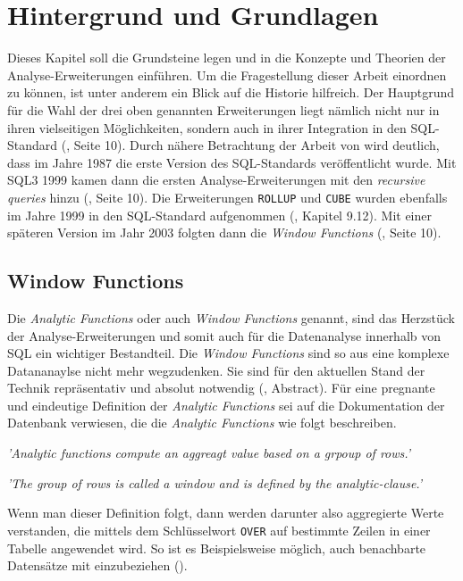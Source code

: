 \chapter{Hintergrund und Grundlagen}
Dieses Kapitel soll die Grundsteine legen und in die Konzepte und Theorien der Analyse-Erweiterungen
einführen. Um die Fragestellung dieser Arbeit einordnen zu können, ist unter anderem
ein Blick auf die Historie hilfreich. Der Hauptgrund für die Wahl der drei oben
genannten Erweiterungen liegt nämlich nicht nur in ihren vielseitigen
Möglichkeiten, sondern auch in ihrer Integration in den SQL-Standard (\cite{grust2017advanced},
Seite 10). Durch nähere Betrachtung der Arbeit von \cite{grust2017advanced} wird
deutlich, dass im Jahre 1987 die erste Version des SQL-Standards veröffentlicht
wurde. Mit SQL3 1999 kamen dann die ersten Analyse-Erweiterungen mit den \textit{recursive
queries} hinzu (\cite{grust2017advanced}, Seite 10). Die Erweiterungen \texttt{ROLLUP}
und \texttt{CUBE} wurden ebenfalls im Jahre 1999 in den SQL-Standard aufgenommen
(\cite{melton2001sql}, Kapitel 9.12). Mit einer späteren Version im Jahr 2003
folgten dann die \textit{Window Functions} (\cite{grust2017advanced}, Seite 10).

\section{Window Functions}
Die \textit{Analytic Functions} oder auch \textit{Window Functions} genannt, sind
das Herzstück der Analyse-Erweiterungen und somit auch für die Datenanalyse innerhalb
von SQL ein wichtiger Bestandteil. Die \textit{Window Functions} sind so aus eine
komplexe Datananaylse nicht mehr wegzudenken. Sie sind für den aktuellen Stand
der Technik repräsentativ und absolut notwendig (\cite{cao2012optimization},
Abstract). Für eine pregnante und eindeutige Definition der \textit{Analytic
Functions} sei auf die Dokumentation der \citet{oracle} Datenbank verwiesen, die
die \textit{Analytic Functions} wie folgt beschreiben.
\begin{center}
	\textit{ 'Analytic functions compute an aggreagt value based on a grpoup of
	rows.' } \\ \cite{oracle}

	\textit{ 'The group of rows is called a window and is defined by the analytic-clause.'
	} \\ \cite{oracle}
\end{center}
Wenn man dieser Definition folgt, dann werden darunter also aggregierte Werte
verstanden, die mittels dem Schlüsselwort \texttt{OVER} auf bestimmte Zeilen in
einer Tabelle angewendet wird. So ist es Beispielsweise möglich, auch
benachbarte Datensätze mit einzubeziehen (\cite{oracle}).

